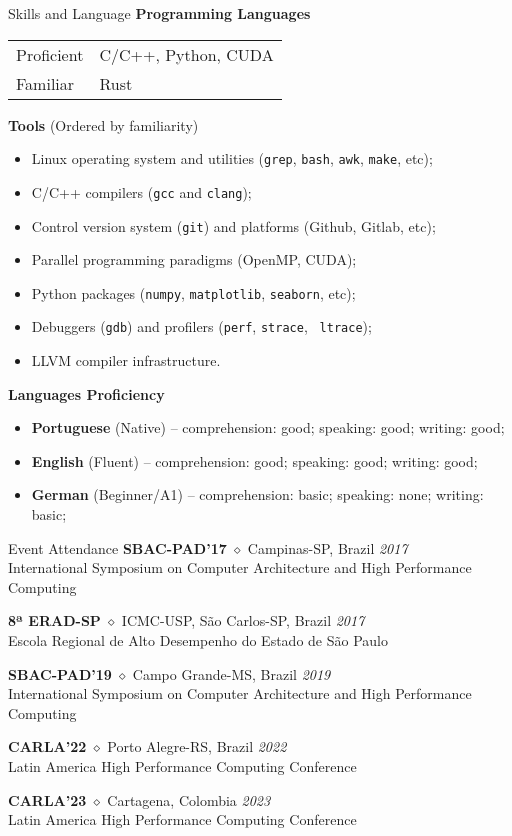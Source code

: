 \documentclass{resume}
\begin{document}
\begin{rSection}{Skills and Language}
{\bf Programming Languages}

\begin{tabular}{ll} Proficient & C/C++, Python, CUDA \\
  Familiar   & Rust \\
\end{tabular}

{\bf Tools} {\small (Ordered by familiarity)}
\begin{itemize}[noitemsep]
  \item Linux operating system and utilities ({\tt grep}, {\tt bash}, {\tt awk},
    {\tt make}, etc);
  \item C/C++ compilers ({\tt gcc} and {\tt clang});
  \item Control version system ({\tt git}) and platforms (Github, Gitlab, etc);
  \item Parallel programming paradigms (OpenMP, CUDA);
  \item Python packages ({\tt numpy}, {\tt matplotlib}, {\tt seaborn}, etc);
  \item Debuggers ({\tt gdb}) and profilers ({\tt perf}, {\tt strace}, {\tt
    ltrace});
  \item LLVM compiler infrastructure.
\end{itemize}

{\bf Languages Proficiency}
\begin{itemize}[noitemsep]
  \item {\bf Portuguese} (Native) -- comprehension: good; speaking: good; writing: good;
  \item {\bf English} (Fluent) -- comprehension: good; speaking: good; writing: good;
  \item {\bf German} (Beginner/A1) -- comprehension: basic; speaking: none; writing: basic;
\end{itemize}
\end{rSection}

\begin{rSection}{Event Attendance}
{\bf SBAC-PAD'17} $\diamond$ Campinas-SP, Brazil \hfill {\em 2017} \\
International Symposium on Computer Architecture and High Performance
Computing

{\bf 8ª ERAD-SP} $\diamond$ ICMC-USP, São Carlos-SP, Brazil \hfill {\em 2017} \\
Escola Regional de Alto Desempenho do Estado de São Paulo

{\bf SBAC-PAD'19} $\diamond$ Campo Grande-MS, Brazil \hfill {\em 2019} \\
International Symposium on Computer Architecture and High Performance
Computing

{\bf CARLA'22} $\diamond$ Porto Alegre-RS, Brazil \hfill {\em 2022} \\
Latin America High Performance Computing Conference

{\bf CARLA'23} $\diamond$ Cartagena, Colombia \hfill {\em 2023} \\
Latin America High Performance Computing Conference
\end{rSection}
\end{document}
